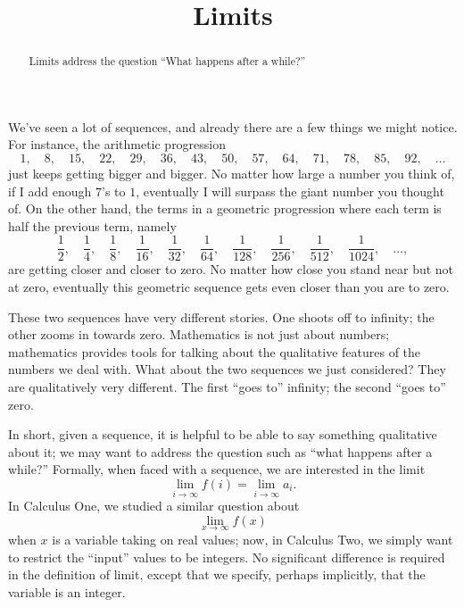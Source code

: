 \documentclass{ximera}
\title{Limits}
\begin{document}
\begin{abstract}
  Limits address the question ``What happens after a while?''
\end{abstract}

\maketitle

We've seen a lot of sequences, and already there are a few things we
might notice.  For instance, the arithmetic progression
$$
1,\quad 8,\quad 15,\quad 22,\quad 29,\quad 36,\quad 43,\quad 50,\quad 57,\quad 64,\quad 71,\quad 78,\quad 85,\quad 92,\quad \ldots
$$
just keeps getting bigger and bigger.  No matter how large a number
you think of, if I add enough $7$'s to $1$, eventually I will surpass
the giant number you thought of.  On the other hand, the terms in a geometric progression where each term is half the previous term, namely
$$
\frac{1}{2},\quad \frac{1}{4},\quad \frac{1}{8},\quad \frac{1}{16},\quad \frac{1}{32},\quad \frac{1}{64},\quad \frac{1}{128},\quad \frac{1}{256},\quad \frac{1}{512},\quad \frac{1}{1024},\quad \ldots ,
$$
are getting closer and closer to zero.  No matter how close you stand
near but not at zero, eventually this geometric sequence gets even closer than you
are to zero.


These two sequences have very different stories.  One shoots off to
infinity; the other zooms in towards zero.  Mathematics is not just
about numbers; mathematics provides tools for talking about the
qualitative features of the numbers we deal with.  What about the two
sequences we just considered?  They are qualitatively very different.  The first ``goes to''
infinity; the second ``goes to'' zero.

In short, given a sequence, it is helpful to be able to say something
qualitative about it; we may want to address the question such as
``what happens after a while?'' Formally, when faced with a sequence,
we are interested in the limit
$$\lim_{i\to \infty} f(i) = \lim_{i\to\infty} a_i.$$
In Calculus One, we studied a similar question about
$$\lim_{x\to\infty} f(x)$$
when $x$ is a variable taking on real values; now, in Calculus Two, we
simply want to restrict the ``input'' values to be integers. No
significant difference is required in the definition of limit, except
that we specify, perhaps implicitly, that the variable is an integer.
\end{document}
